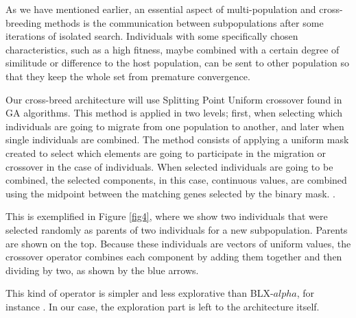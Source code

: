 \documentclass[runningheads]{llncs}
\begin{document}
As we have mentioned earlier, an essential aspect of multi-population
and cross-breeding methods is
the communication between subpopulations after some iterations of isolated
search. Individuals with some specifically chosen characteristics,
such as a high fitness, maybe combined with a certain degree of
similitude or difference to the host population, can be sent to other
population so that they keep the whole set from premature
convergence.

Our cross-breed architecture will use Splitting Point Uniform crossover found in GA
algorithms. %
This method is applied in two levels; first, when selecting which
individuals are going to migrate from one population to another, and later when
single individuals are combined. The method consists of applying a uniform mask
created to select which elements are going to participate in the migration or
crossover in the case of individuals. When selected individuals are going to be
combined, the selected components, in this case, continuous values, are combined
using the midpoint between the matching genes selected by the binary mask.
\cite{Kramer2017,Kaya2011}.

This is exemplified in Figure \ref{fig4}, where we show
two individuals that were selected randomly as parents of two individuals for a
new subpopulation. Parents are shown on the top. Because these individuals are
vectors of uniform values, the crossover operator combines each component by
adding them together and then dividing by two, as shown by the blue arrows.  

This kind of operator is simpler and less explorative than
BLX-$alpha$, for instance \cite{picek2013recombination}. In our case,
the exploration part is left to the architecture itself.

  
\end{document}
